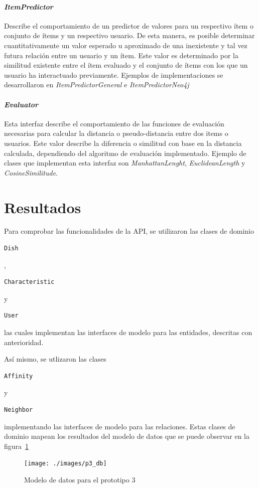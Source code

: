     \paragraph{\emph{ItemPredictor}}
      Describe el comportamiento de un predictor de valores para un respectivo ítem o conjunto de ítems y un respectivo usuario. De esta manera, es posible determinar cuantitativamente un valor esperado u aproximado de una inexistente y tal vez futura relación entre un usuario y un ítem. Este valor es determinado por la similitud existente entre el ítem evaluado y el conjunto de ítems con los que un usuario ha interactuado previamente. Ejemplos de implementaciones se desarrollaron en \emph{ItemPredictorGeneral} e \emph{ItemPredictorNeo4j} 

    \paragraph{\emph{Evaluator}}
      Esta interfaz describe el comportamiento de las funciones de evaluación necesarias para calcular la distancia o pseudo-distancia entre dos items o usuarios. Este valor describe la diferencia o similitud con base en la distancia calculada, dependiendo del algoritmo de evaluación implementado. Ejemplo de clases que implementan esta interfaz son \emph{ManhattanLenght}, \emph{EuclideanLength} y \emph{CosineSimilitude}. 

    
  \section{Resultados}
    Para comprobar las funcionalidades de la API, se utilizaron las clases de dominio \begin{verbatim}Dish\end{verbatim}, \begin{verbatim}Characteristic\end{verbatim} y \begin{verbatim}User\end{verbatim} las cuales implementan las interfaces de modelo para las entidades, descritas con anterioridad.

    Así mismo, se utlizaron las clases \begin{verbatim}Affinity\end{verbatim} y \begin{verbatim}Neighbor\end{verbatim} implementando las interfaces de modelo para las relaciones. Estas clases de dominio mapean los resultados del modelo de datos que se puede observar en la figura~\ref{fig:p3_db}

    \begin{figure}[h!]
      \centering
      \texttt{[image: ./images/p3\_db]}
      \caption{Modelo de datos para el prototipo 3}
      \label{fig:p3_db}
    \end{figure}